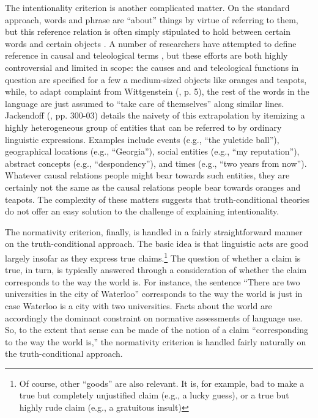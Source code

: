 The intentionality criterion is another complicated matter. On the standard approach, words and phrase are ``about'' things by virtue of referring to them, but this reference relation is often simply stipulated to hold between certain words and certain objects \citep{Stanley:2008}. A number of researchers have attempted to define reference in causal and teleological terms \citep{Speaks:2014,Dennett:1987,Millikan:1989}, but these efforts are both highly controversial \citep{Horwich:2005} and limited in scope: the causes and and teleological functions in question are specified for a few a medium-sized objects like oranges and teapots, while, to adapt complaint from Wittgenstein (\citeyear{Wittgenstein:1953}, p. 5), the rest of the words in the language are just assumed to ``take care of themselves'' along similar lines. Jackendoff (\citeyear{Jackendoff:2002}, pp. 300-03) details the naivety of this extrapolation by itemizing a highly heterogeneous group of entities that can be referred to by ordinary linguistic expressions. Examples include events (e.g., ``the yuletide ball''), geographical locations (e.g., ``Georgia''), social entities (e.g., ``my reputation''), abstract concepts (e.g., ``despondency''), and times (e.g., ``two years from now''). Whatever causal relations people might bear towards such entities, they are certainly not the same as the causal relations people bear towards oranges and teapots. The complexity of these matters suggests that truth-conditional theories do not offer an easy solution to the challenge of explaining intentionality.

The normativity criterion, finally, is handled in a fairly straightforward manner on the truth-conditional approach. The basic idea is that linguistic acts are good largely insofar as they express true claims.\footnote{Of course, other ``goods'' are also relevant. It is, for example, bad to make a true but completely unjustified claim (e.g., a lucky guess), or a true but highly rude claim (e.g., a gratuitous insult)} The question of whether a claim is true, in turn, is typically answered through a consideration of whether the claim corresponds to the way the world is. For instance, the sentence ``There are two universities in the city of Waterloo'' corresponds to the way the world is just in case Waterloo is a city with two universities. Facts about the world are accordingly the dominant constraint on normative assessments of language use. So, to the extent that sense can be made of the notion of a claim ``corresponding to the way the world is,'' the normativity criterion is handled fairly naturally on the truth-conditional approach.

